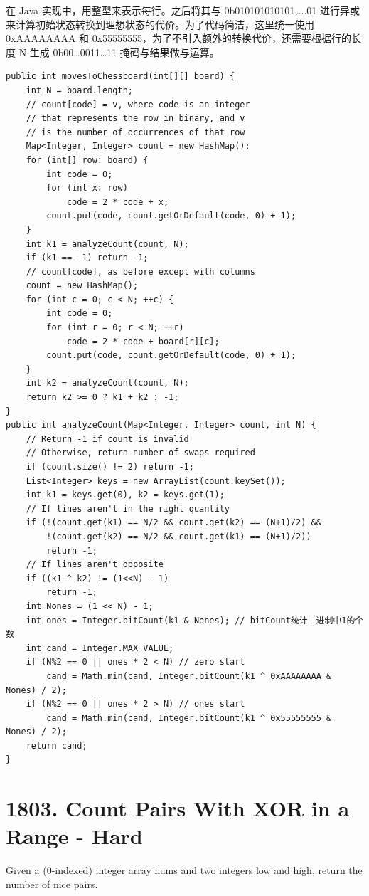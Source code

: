 \documentclass[9pt, b5paaper]{book}
\begin{document}
在 Java 实现中，用整型来表示每行。之后将其与 0b010101010101\ldots{}..01 进行异或来计算初始状态转换到理想状态的代价。为了代码简洁，这里统一使用 0xAAAAAAAA 和 0x55555555，为了不引入额外的转换代价，还需要根据行的长度 N 生成 0b00\ldots{}0011\ldots{}11 掩码与结果做与运算。
\begin{verbatim}
public int movesToChessboard(int[][] board) {
    int N = board.length;
    // count[code] = v, where code is an integer
    // that represents the row in binary, and v
    // is the number of occurrences of that row
    Map<Integer, Integer> count = new HashMap();
    for (int[] row: board) {
        int code = 0;
        for (int x: row)
            code = 2 * code + x;
        count.put(code, count.getOrDefault(code, 0) + 1);
    }
    int k1 = analyzeCount(count, N);
    if (k1 == -1) return -1;
    // count[code], as before except with columns
    count = new HashMap();
    for (int c = 0; c < N; ++c) {
        int code = 0;
        for (int r = 0; r < N; ++r)
            code = 2 * code + board[r][c];
        count.put(code, count.getOrDefault(code, 0) + 1);
    }
    int k2 = analyzeCount(count, N);
    return k2 >= 0 ? k1 + k2 : -1;
}
public int analyzeCount(Map<Integer, Integer> count, int N) {
    // Return -1 if count is invalid
    // Otherwise, return number of swaps required
    if (count.size() != 2) return -1;
    List<Integer> keys = new ArrayList(count.keySet());
    int k1 = keys.get(0), k2 = keys.get(1);
    // If lines aren't in the right quantity
    if (!(count.get(k1) == N/2 && count.get(k2) == (N+1)/2) &&
        !(count.get(k2) == N/2 && count.get(k1) == (N+1)/2))
        return -1;
    // If lines aren't opposite
    if ((k1 ^ k2) != (1<<N) - 1)
        return -1;
    int Nones = (1 << N) - 1;
    int ones = Integer.bitCount(k1 & Nones); // bitCount统计二进制中1的个数
    int cand = Integer.MAX_VALUE;
    if (N%2 == 0 || ones * 2 < N) // zero start
        cand = Math.min(cand, Integer.bitCount(k1 ^ 0xAAAAAAAA & Nones) / 2);
    if (N%2 == 0 || ones * 2 > N) // ones start
        cand = Math.min(cand, Integer.bitCount(k1 ^ 0x55555555 & Nones) / 2);
    return cand;
}
\end{verbatim}

\section{1803. Count Pairs With XOR in a Range - Hard}
\label{sec-10-10}
Given a (0-indexed) integer array nums and two integers low and high, return the number of nice pairs.
\end{document}

